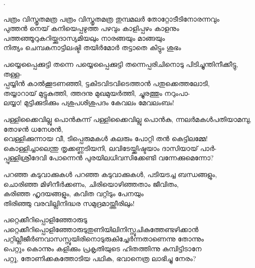 \begin{enumerate}
.



\begin{slokam}{\VSv}{\KN}{പത്രം വിസ്തൃതമത്ര}
പത്രം വിസ്തൃതമത്ര തുമ്പമലർ തോറ്റോടീടിനോരന്നവും\\
പുത്തൻ നെയ്‌ കനിയെപ്പഴുത്ത പഴവും കാളിപ്പഴം കാളനും\\
പത്തഞ്ഞൂറുകറിയ്ക്കുദാസ്യമിയലും നാരങ്ങയും മാങ്ങയും\\
നിത്യം ചെമ്പകനാട്ടിലഷ്ടി തയിർമോർ തട്ടാതെ കിട്ടും ശുഭം
\end{slokam}


\begin{slokam}{\VSr}{\VenM}{പയ്യെപ്പൈക്കുട്ടി തന്നെ}
പയ്യെപ്പൈക്കുട്ടി തന്നെപ്പരിചിനൊടു പിടിച്ചുന്തിനീക്കീട്ടു, തള്ള-\\
പ്പയ്യിൻ കാൽക്കൂടണഞ്ഞി, ട്ടകിടവിടവിടെത്താൻ പതുക്കെത്തലോടി,\\
തയ്യാറായ്‌ മുട്ടുകുത്തി, ത്തദനു മുഖമുയർത്തി, ച്ചുരത്തും നറുംപാ-\\
ലയ്യാ! മുട്ടിക്കുടിക്കും പശുപശിശുപദം കേവലം മേ\prash{}വലംബം!
\end{slokam}


\begin{slokam}{\VSr}{\VNM}{പള്ളിക്കൈവില്ലു പൊൻകുന്ന്}
പള്ളിക്കൈവില്ലു പൊൻകു, ന്നലർമകള്‍പതിയാമമ്പു, തോഴൻ ധനേശൻ,\\
വെള്ളിക്കുന്നായ വീ, ടിപ്പെരുമകള്‍ കലരും പോറ്റി തൻ കെട്ടിലമ്മേ!\\
കൊള്ളിച്ചാലെന്തു തൃക്കണ്ണടിയനി, ലവിടേയ്ക്കിഷ്ടയാം ദാസിയായ്‌ പാർ-\\
പ്പുള്ളിശ്രീദേവി പോന്നെൻ പുരയിലധിവസിക്കേണ്ടി വന്നേക്കുമെന്നോ?
\end{slokam}



\begin{slokam}{\VPv}{\UN}{പറഞ്ഞ കടുവാക്കുകൾ}
പറഞ്ഞ കടുവാക്കുകൾ, പടിയടച്ച ബന്ധങ്ങളും,\\
ചൊരിഞ്ഞ മിഴിനീർക്കണം, ചിരിയൊഴിഞ്ഞതാം ജീവിതം,\\
കരിഞ്ഞ ഹൃദയങ്ങളും, കവിത വറ്റിടും പേനയും\\
തിരിഞ്ഞു വരവില്ലിനിദ്ധര സമുദ്രമായ്ത്തീരിലും!
\end{slokam}


\begin{slokam}{\VSr}{\VKG}{പറ്റെക്കീറിപ്പൊളിഞ്ഞോരുടു}
പറ്റെക്കീറിപ്പൊളിഞ്ഞോരുടുതുണിയിലിനിസ്സൂചികുത്തേണ്ടഴിക്കാന്‍\\
പറ്റില്ലീജീര്‍ണവാസസ്സുയിരിനൊടുരുകിച്ചേര്‍ന്നതാണെന്നു തോന്നും\\
പെറ്റും കൊന്നും കളിക്കും പ്രകൃതിയുടെ ഹിതത്തിന്നു കുമ്പിട്ടിടാനേ\\
പറ്റൂ, തോണിക്കകത്തോടിയ പഥിക, ഭവാനെത്ര ലാഭിച്ചു നേരം?
\end{slokam}


\end{enumerate}
